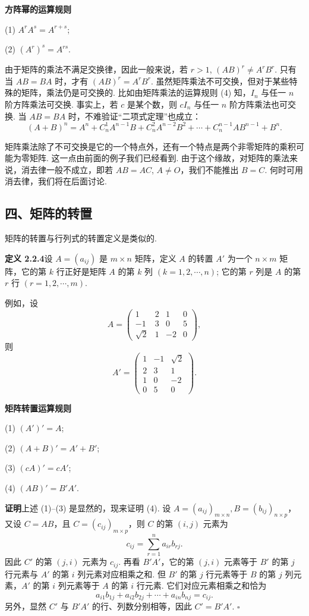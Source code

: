 \documentclass[UTF8,12pt,a4paper,fontset=fandol]{ctexart}
\begin{document}
\noindent\textbf{方阵幂的运算规则}

(1) $A^rA^s=A^{r+s}$;

(2) $(A^r)^s=A^{rs}$.

由于矩阵的乘法不满足交换律，因此一般来说，若 $r>1$, $(AB)^r\ne A^rB^r$. 只有当 $AB=BA$ 时，才有 $(AB)^r=A^rB^r$. 虽然矩阵乘法不可交换，但对于某些特殊的矩阵，乘法仍是可交换的. 比如由矩阵乘法的运算规则 (4) 知，$I_n$ 与任一 $n$ 阶方阵乘法可交换. 事实上，若 $c$ 是某个数，则 $cI_n$ 与任一 $n$ 阶方阵乘法也可交换. 当 $AB=BA$ 时，不难验证``二项式定理''也成立：
\[
(A+B)^n=A^n+C_n^1A^{n-1}B+C_n^2A^{n-2}B^2+\cdots+C_n^{n-1}AB^{n-1}+B^n.
\]

矩阵乘法除了不可交换是它的一个特点外，还有一个特点是两个非零矩阵的乘积可能为零矩阵. 这一点由前面的例子我们已经看到. 由于这个缘故，对矩阵的乘法来说，消去律一般不成立，即若 $AB=AC$, $A\ne O$，我们不能推出 $B=C$. 何时可用消去律，我们将在后面讨论.

\subsection*{四、矩阵的转置}

矩阵的转置与行列式的转置定义是类似的.

\noindent\textbf{定义 2.2.4}\quad 设 $A=(a_{ij})$ 是 $m\times n$ 矩阵，定义 $A$ 的转置 $A'$ 为一个 $n\times m$ 矩阵，它的第 $k$ 行正好是矩阵 $A$ 的第 $k$ 列 $(k=1,2,\cdots,n)$; 它的第 $r$ 列是 $A$ 的第 $r$ 行 $(r=1,2,\cdots,m)$.

例如，设
\[
A=\left(\begin{array}{cccc}
1 & 2 & 1 & 0\\
-1 & 3 & 0 & 5\\
\sqrt{2} & 1 & -2 & 0
\end{array}\right),
\]
则
\[
A'=\left(\begin{array}{ccc}
1 & -1 & \sqrt{2}\\
2 & 3 & 1\\
1 & 0 & -2\\
0 & 5 & 0
\end{array}\right).
\]

\noindent\textbf{矩阵转置运算规则}

(1) $(A')'=A$;

(2) $(A+B)'=A'+B'$;

(3) $(cA)'=cA'$;

(4) $(AB)'=B'A'$.

\noindent\textbf{证明}\quad 上述 (1)--(3) 是显然的，现来证明 (4). 设 $A=(a_{ij})_{m\times n}, B=(b_{ij})_{n\times p}$，又设 $C=AB$，且 $C=(c_{ij})_{m\times p}$，则 $C$ 的第 $(i,j)$ 元素为
\[
c_{ij}=\sum_{r=1}^{n}a_{ir}b_{rj}.
\]
因此 $C'$ 的第 $(j,i)$ 元素为 $c_{ij}$. 再看 $B'A'$，它的第 $(j,i)$ 元素等于 $B'$ 的第 $j$ 行元素与 $A'$ 的第 $i$ 列元素对应相乘之和. 但 $B'$ 的第 $j$ 行元素等于 $B$ 的第 $j$ 列元素，$A'$ 的第 $i$ 列元素等于 $A$ 的第 $i$ 行元素. 它们对应元素相乘之和恰为
\[
a_{i1}b_{1j}+a_{i2}b_{2j}+\cdots+a_{in}b_{nj}=c_{ij}.
\]
另外，显然 $C'$ 与 $B'A'$ 的行、列数分别相等，因此 $C'=B'A'$. $\square$
\end{document}
